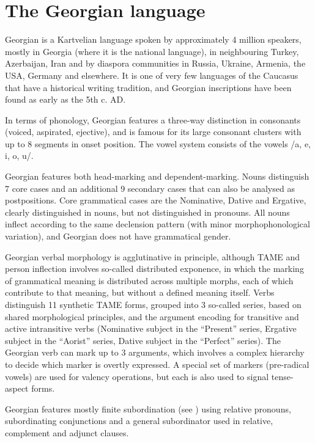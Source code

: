 \section{The Georgian language} \label{introgeorgian}

Georgian is a Kartvelian language spoken by approximately 4 million speakers, mostly in Georgia (where it is the national language), in neighbouring Turkey, Azerbaijan, Iran and by diaspora communities in Russia, Ukraine, Armenia, the USA, Germany and elsewhere. It is one of very few languages of the Caucasus that have a historical writing tradition, and Georgian inscriptions have been found as early as the 5th c. AD. 

In terms of phonology, Georgian features a three-way distinction in consonants (voiced, aspirated, ejective), and is famous for its large consonant clusters with up to 8 segments in onset position. The vowel system consists of the vowels /a, e, i, o, u/.  

Georgian features both head-marking and dependent-marking. Nouns distinguish 7 core cases and an additional 9 secondary cases that can also be analysed as postpositions. Core grammatical cases are the Nominative, Dative and Ergative, clearly distinguished in nouns, but not distinguished in pronouns. All nouns inflect according to the same declension pattern (with minor morphophonological variation), and Georgian does not have grammatical gender. 

Georgian verbal morphology is agglutinative in principle, although TAME and person inflection involves so-called distributed exponence, in which the marking of grammatical meaning is distributed across multiple morphs, each of which contribute to that meaning, but without a defined meaning itself. Verbs distinguish 11 synthetic TAME forms, grouped into 3 so-called series, based on shared morphological principles, and the argument encoding for transitive and active intransitive verbs (Nominative subject in the ``Present'' series, Ergative subject in the ``Aorist'' series, Dative subject in the ``Perfect'' series).  The Georgian verb can mark up to 3 arguments, which involves a complex hierarchy to decide which marker is overtly expressed. A special set of markers (pre-radical vowels) are used for valency operations, but each is also used to signal tense-aspect forms.

Georgian features mostly finite subordination (see ) using relative pronouns, subordinating conjunctions and a general subordinator used in relative, complement and adjunct clauses. 

